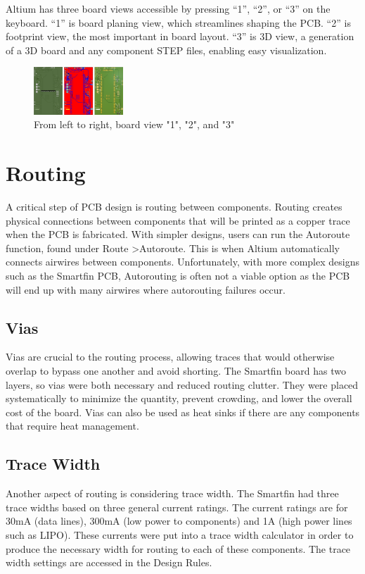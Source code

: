 \documentclass[twocolumn]{article}
\begin{document}
Altium has three board views accessible by pressing “1”, “2”, or “3” on the keyboard. “1” is board planing view, which streamlines shaping the PCB. “2” is footprint view, the most important in board layout. “3” is 3D view, a generation of a 3D board and any component STEP files, enabling easy visualization. 

\begin{figure}[h]
    \centering
    \includegraphics[width=0.3\textwidth]{board view.png}
    \caption{From left to right, board view "1", "2", and "3"}
    \label{fig:board-view}
\end{figure}

\section{Routing}

A critical step of PCB design is routing between components. Routing creates physical connections between components that will be printed as a copper trace when the PCB is fabricated. With simpler designs, users can run the Autoroute function, found under Route \textgreater Autoroute. This is when Altium automatically connects airwires between components. Unfortunately, with more complex designs such as the Smartfin PCB, Autorouting is often not a viable option as the PCB will end up with many airwires where autorouting failures occur.

\subsection{Vias}
Vias are crucial to the routing process, allowing traces that would otherwise overlap to bypass one another and avoid shorting. The Smartfin board has two layers, so vias were both necessary and reduced routing clutter. They were placed systematically to minimize the quantity, prevent crowding, and lower the overall cost of the board. Vias can also be used as heat sinks if there are any components that require heat management. 

\subsection{Trace Width}
Another aspect of routing is considering trace width. The Smartfin had three trace widths based on three general current ratings. The current ratings are for 30mA (data lines), 300mA (low power to components) and 1A (high power lines such as LIPO). These currents were put into a trace width calculator in order to produce the necessary width for routing to each of these components. The trace width settings are accessed in the Design Rules. 
\end{document}
